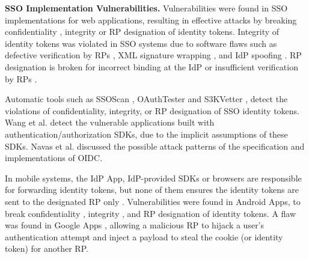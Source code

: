 \vspace{0.8mm}
\noindent\textbf{SSO Implementation Vulnerabilities.}
Vulnerabilities were found in SSO implementations for web applications,
    resulting in effective attacks %
     by breaking confidentiality \cite{WangCW12,ccsSunB12,ArmandoCCCPS13,DiscoveringJCS,dimvaLiM16}, integrity \cite{WangCW12,SomorovskyMSKJ12,WangZLG16,MainkaMS16, MainkaMSW17,dimvaLiM16} or RP designation \cite{WangZLG16,MainkaMS16,MainkaMSW17,YangLCZ18,dimvaLiM16} of identity tokens.
Integrity of identity tokens was violated in SSO systems  %
due to software flaws such as
 defective verification by RPs \cite{WangCW12,WangZLG16,MainkaMSW17}, XML signature wrapping \cite{SomorovskyMSKJ12}, and IdP spoofing \cite{MainkaMS16,MainkaMSW17}.
RP designation is broken
    for incorrect binding at the IdP \cite{YangLCZ18,WangZLG16} or insufficient verification by RPs \cite{MainkaMS16,MainkaMSW17,YangLCZ18}.

Automatic tools such as SSOScan \cite{ZhouE14}, OAuthTester \cite{YangLLZH16} and S3KVetter \cite{YangLCZ18},
detect the violations of confidentiality, integrity, or RP designation of SSO identity tokens.
Wang et al. \cite{ExplicatingSDK} detect the vulnerable applications
    built with authentication/authorization SDKs,
     due to the implicit assumptions of these SDKs.
Navas et al. \cite{NavasB19} discussed the possible attack patterns of the specification and implementations of OIDC.

In mobile systems,
the IdP App,
    IdP-provided SDKs %
     or browsers
         are responsible for forwarding identity tokens, %
but none of them ensures the identity tokens are sent to the designated RP only \cite{ChenPCTKT14,WangZLLYLG15}.
Vulnerabilities were found in Android Apps,
    to break confidentiality \cite{ChenPCTKT14,WangZLLYLG15,YangLS17,ShiWL19}, integrity \cite{ChenPCTKT14,YangLS17}, and RP designation \cite{ChenPCTKT14,ShiWL19} of identity tokens.
A flaw was found in Google Apps \cite{ArmandoCCCPS13}, allowing a malicious RP to hijack a user's authentication attempt and inject a payload to steal the cookie (or identity token) for another RP.

